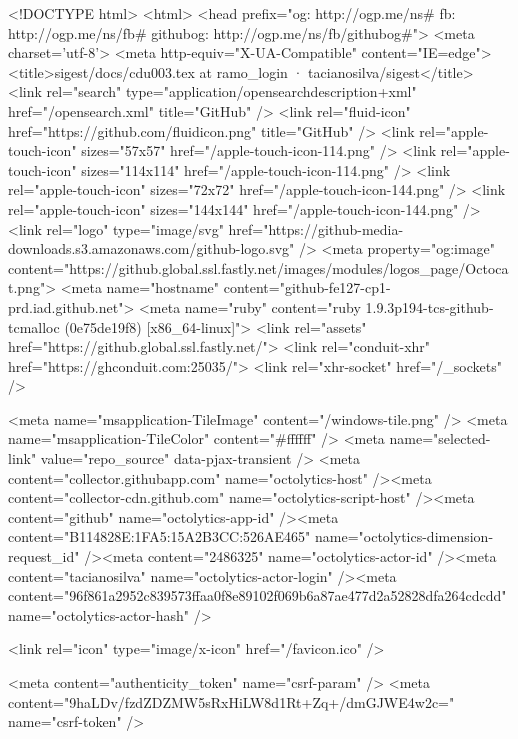 


<!DOCTYPE html>
<html>
  <head prefix="og: http://ogp.me/ns# fb: http://ogp.me/ns/fb# githubog: http://ogp.me/ns/fb/githubog#">
    <meta charset='utf-8'>
    <meta http-equiv="X-UA-Compatible" content="IE=edge">
        <title>sigest/docs/cdu003.tex at ramo_login · tacianosilva/sigest</title>
    <link rel="search" type="application/opensearchdescription+xml" href="/opensearch.xml" title="GitHub" />
    <link rel="fluid-icon" href="https://github.com/fluidicon.png" title="GitHub" />
    <link rel="apple-touch-icon" sizes="57x57" href="/apple-touch-icon-114.png" />
    <link rel="apple-touch-icon" sizes="114x114" href="/apple-touch-icon-114.png" />
    <link rel="apple-touch-icon" sizes="72x72" href="/apple-touch-icon-144.png" />
    <link rel="apple-touch-icon" sizes="144x144" href="/apple-touch-icon-144.png" />
    <link rel="logo" type="image/svg" href="https://github-media-downloads.s3.amazonaws.com/github-logo.svg" />
    <meta property="og:image" content="https://github.global.ssl.fastly.net/images/modules/logos_page/Octocat.png">
    <meta name="hostname" content="github-fe127-cp1-prd.iad.github.net">
    <meta name="ruby" content="ruby 1.9.3p194-tcs-github-tcmalloc (0e75de19f8) [x86_64-linux]">
    <link rel="assets" href="https://github.global.ssl.fastly.net/">
    <link rel="conduit-xhr" href="https://ghconduit.com:25035/">
    <link rel="xhr-socket" href="/_sockets" />
    


    <meta name="msapplication-TileImage" content="/windows-tile.png" />
    <meta name="msapplication-TileColor" content="#ffffff" />
    <meta name="selected-link" value="repo_source" data-pjax-transient />
    <meta content="collector.githubapp.com" name="octolytics-host" /><meta content="collector-cdn.github.com" name="octolytics-script-host" /><meta content="github" name="octolytics-app-id" /><meta content="B114828E:1FA5:15A2B3CC:526AE465" name="octolytics-dimension-request_id" /><meta content="2486325" name="octolytics-actor-id" /><meta content="tacianosilva" name="octolytics-actor-login" /><meta content="96f861a2952c839573ffaa0f8e89102f069b6a87ae477d2a52828dfa264cdcdd" name="octolytics-actor-hash" />
    

    
    
    <link rel="icon" type="image/x-icon" href="/favicon.ico" />

    <meta content="authenticity_token" name="csrf-param" />
<meta content="9haLDv/fzdZDZMW5sRxHiLW8d1Rt+Zq+/dmGJWE4w2c=" name="csrf-token" />

